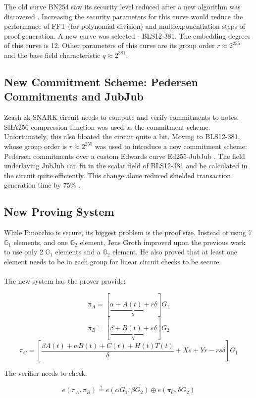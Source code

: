 The old curve BN254 saw its security level reduced after a new algorithm was discovered \cite{zcashbls12381}. Increasing the security parameters for this curve would reduce the performance of FFT (for polynomial division) and multiexponentiation steps of proof generation. A new curve was selected - BLS12-381. The embedding degrees of this curve is 12. Other parameters of this curve are its group order $r \approx 2^{255}$ and the base field characteristic $q \approx 2^{381}$.

\subsection{New Commitment Scheme: Pedersen Commitments and JubJub}

Zcash zk-SNARK circuit needs to compute and verify commitments to notes. SHA256 compression function was used as the commitment scheme. Unfortunately, this also bloated the circuit quite a bit. Moving to BLS12-381, whose group order is $r \approx 2^{255}$ was used to introduce a new commitment scheme: Pedersen commitments over a custom Edwards curve Ed255-JubJub \cite{zcashjubjub}. The field underlaying JubJub can fit in the scalar field of BLS12-381 and be calculated in the circuit quite efficiently. This change alone reduced shielded transaction generation time by 75\% \cite{zcashreducing}.

\subsection{New Proving System}
\label{grothexpl}

While Pinocchio is secure, its biggest problem is the proof size. Instead of using 7 $\mathbb{G}_1$ elements, and one $\mathbb{G}_2$ element, Jens Groth \cite{groth2016size} improved upon the previous work to use only 2 $\mathbb{G}_1$ elements and a $\mathbb{G}_2$ element. He also proved that at least one element needs to be in each group for linear circuit checks to be secure.\\
\\
The new system has the prover provide:

$$ \pi_A = [\underbrace{\alpha + A(t) + r\delta}_\text{X}]G_1 $$
$$ \pi_B = [\underbrace{\beta + B(t) + s\delta}_\text{Y}]G_2 $$
$$ \pi_C = [\frac{\beta A(t) + \alpha B(t) + C(t) + H(t)T(t)}{\delta} + Xs + Yr - rs\delta]G_1 $$

\noindent The verifier needs to check:

$$ e(\pi_A, \pi_B) \stackrel{?}{=} e(\alpha G_1, \beta G_2) \oplus e(\pi_C, \delta G_2) $$

